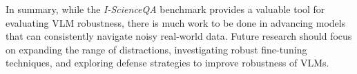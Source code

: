 In summary, while the \emph{I-ScienceQA} benchmark provides a valuable tool for evaluating VLM robustness, there is much work to be done in advancing models that can consistently navigate noisy real-world data. Future research should focus on expanding the range of distractions, investigating robust fine-tuning techniques, and exploring defense strategies to improve robustness of VLMs.